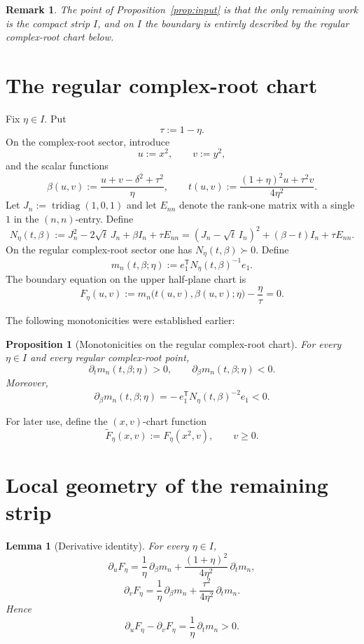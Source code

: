 \documentclass[11pt]{article}
\newtheorem{proposition}[theorem]{Proposition}
\newtheorem{lemma}[theorem]{Lemma}
\newtheorem{remark}[theorem]{Remark}
\begin{document}
\begin{remark}
The point of Proposition~\ref{prop:input} is that the only remaining work is the compact strip \(I\), and on \(I\) the boundary is entirely described by the regular complex-root chart below.
\end{remark}

\section{The regular complex-root chart}

Fix \(\eta\in I\). Put
\[
\tau:=1-\eta.
\]
On the complex-root sector, introduce
\[
u:=x^2,\qquad v:=y^2,
\]
and the scalar functions
\[
\beta(u,v):=\frac{u+v-\delta^2+\tau^2}{\eta},
\qquad
t(u,v):=\frac{(1+\eta)^2u+\tau^2 v}{4\eta^2}.
\]
Let \(J_n:=\operatorname{tridiag}(1,0,1)\) and let \(E_{nn}\) denote the rank-one matrix with a single \(1\) in the \((n,n)\)-entry.  Define
\[
N_\eta(t,\beta):=
J_n^2-2\sqrt{t}\,J_n+\beta I_n+\tau E_{nn}
=
(J_n-\sqrt t\,I_n)^2+(\beta-t)I_n+\tau E_{nn}.
\]
On the regular complex-root sector one has \(N_\eta(t,\beta)\succ0\). Define
\[
m_n(t,\beta;\eta):=e_1^{\mathsf T}N_\eta(t,\beta)^{-1}e_1.
\]
The boundary equation on the upper half-plane chart is
\[
F_\eta(u,v):=m_n\bigl(t(u,v),\beta(u,v);\eta\bigr)-\frac{\eta}{\tau}=0.
\]

The following monotonicities were established earlier:

\begin{proposition}[Monotonicities on the regular complex-root chart]\label{prop:monotone-m}
For every \(\eta\in I\) and every regular complex-root point,
\[
\partial_t m_n(t,\beta;\eta)>0,
\qquad
\partial_\beta m_n(t,\beta;\eta)<0.
\]
Moreover,
\[
\partial_\beta m_n(t,\beta;\eta)
=
-\,e_1^{\mathsf T}N_\eta(t,\beta)^{-2}e_1<0.
\]
\end{proposition}

For later use, define the \((x,v)\)-chart function
\[
\widetilde F_\eta(x,v):=F_\eta(x^2,v),
\qquad v\ge0.
\]

\section{Local geometry of the remaining strip}

\begin{lemma}[Derivative identity]\label{lem:derivative-identity}
For every \(\eta\in I\),
\[
\partial_u F_\eta
=
\frac1\eta\,\partial_\beta m_n
+\frac{(1+\eta)^2}{4\eta^2}\,\partial_t m_n,
\]
\[
\partial_v F_\eta
=
\frac1\eta\,\partial_\beta m_n
+\frac{\tau^2}{4\eta^2}\,\partial_t m_n.
\]
Hence
\[
\partial_u F_\eta-\partial_v F_\eta
=
\frac1\eta\,\partial_t m_n
>0.
\]
\end{lemma}
\end{document}
